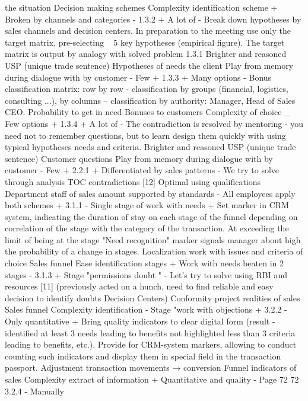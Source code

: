 the situation
Decision making schemes
Complexity
identification
scheme
+
Broken by channels and
categories
-
1.3.2
+
A lot of
-
Break down hypotheses by sales channels and
decision centers. In preparation
to the meeting use only the target
matrix, pre-selecting ~ 5
key hypotheses (empirical figure).
The target matrix is ​​output by analogy with
solved problem 1.3.1
Brighter and
reasoned
USP (unique
trade
sentence)
Hypotheses of needs
the client
Play
from memory during
dialogue with
by customer
-
Few
+
1.3.3
+
Many options
-
Bonus classification matrix: row by row
- classification by groups (financial,
logistics, consulting ...), by
columns -- classification by authority:
Manager, Head of Sales
CEO.
Probability
to get in
need
Bonuses to customers
Complexity
of choice
_
Few options
+
1.3.4
+
A lot of
-
The contradiction is resolved by mentoring -
you need not to remember questions, but to learn
design them quickly with
using typical hypotheses
needs and criteria.
Brighter and
reasoned
USP (unique
trade
sentence)
Customer questions
Play
from memory during
dialogue with
by customer
-
Few
+
2.2.1
+
Differentiated by
sales patterns
-
We try to solve through analysis
TOC contradictions [12]
Optimal
using
qualifications
Department staff
of sales
amount
supported by
standards
-
All employees
apply both schemes
+
3.1.1
-
Single stage of work with
needs
+
Set marker in CRM system,
indicating the duration of stay on
each stage of the funnel depending on
correlation of the stage with the category of the transaction. At
exceeding the limit of being at the stage
"Need recognition" marker
signals manager about high
the probability of a change in stages.
Localization
work with
issues and
criteria
of choice
Sales funnel
Ease
identification
stages
+
Work with needs
beaten in 2 stages
-
3.1.3
+
Stage "permissions
doubt "
-
Let's try to solve using RBI and
resources [11] (previously acted on a hunch,
need to find reliable and easy
decision to identify doubts
Decision Centers)
Conformity
project realities
of sales
Sales funnel
Complexity
identification
-
Stage "work with
objections
+
3.2.2
-
Only quantitative
+
Bring quality indicators to
clear digital form (result -
identified at least 3 needs
leading to benefits not highlighted
less than 3 criteria leading to
benefits, etc.). Provide for
CRM-system markers, allowing to conduct
counting such indicators and display them in
special field in the transaction passport.
Adjustment
transaction movements
→ conversion
Funnel indicators
of sales
Complexity
extract
of information
+
Quantitative and
quality
-
Page 72
72
3.2.4
-
Manually
